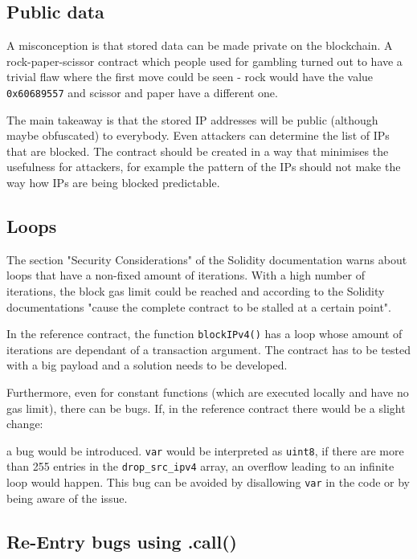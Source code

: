 

\subsection{Public data}
A misconception is that stored data can be made private on the blockchain. A rock-paper-scissor contract which people used for gambling turned out to have a trivial flaw where the first move could be seen - rock would have the value \texttt{0x60689557} and scissor and paper have a different one.

The main takeaway is that the stored IP addresses will be public (although maybe obfuscated) to everybody. Even attackers can determine the list of IPs that are blocked. The contract should be created in a way that minimises the usefulness for attackers, for example the pattern of the IPs should not make the way how IPs are being blocked predictable.

\subsection{Loops}
The section "Security Considerations" of the Solidity documentation warns about loops that have a non-fixed amount of iterations. With a high number of iterations, the block gas limit could be reached and according to the Solidity documentations "cause the complete contract to be stalled at a certain point".

In the reference contract, the function \texttt{blockIPv4()} has a loop whose amount of iterations are dependant of a transaction argument. The contract has to be tested with a big payload and a solution needs to be developed.

Furthermore, even for constant functions (which are executed locally and have no gas limit), there can be bugs. If, in the reference contract there would be a slight change:



a bug would be introduced. \texttt{var} would be interpreted as \texttt{uint8}, if there are more than 255 entries in the \texttt{drop\_src\_ipv4} array, an overflow leading to an infinite loop would happen.
This bug can be avoided by disallowing \texttt{var} in the code or by being aware of the issue.

\subsection{Re-Entry bugs using .call()}

